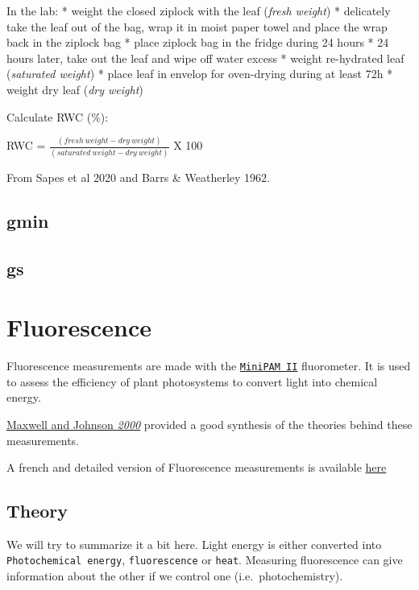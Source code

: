 \documentclass[
  12pt,
  american,
  a4paper,
  extrafontsizes,onecolumn,openright
  ]{memoir}
\begin{document}
In the lab:
* weight the closed ziplock with the leaf (\emph{fresh weight})
* delicately take the leaf out of the bag, wrap it in moist paper towel and place the wrap back in the ziplock bag
* place ziplock bag in the fridge during 24 hours
* 24 hours later, take out the leaf and wipe off water excess
* weight re-hydrated leaf (\emph{saturated weight})
* place leaf in envelop for oven-drying during at least 72h
* weight dry leaf (\emph{dry weight})

Calculate RWC (\%):

RWC = \(\frac{(fresh\ weight-dry\ weight)}{(saturated\ weight-dry\ weight)}\) X 100

From Sapes et al 2020 and Barrs \& Weatherley 1962.

\hypertarget{gmin}{%
\section{gmin}\label{gmin}}

\hypertarget{gs}{%
\section{gs}\label{gs}}

\hypertarget{fluorescence}{%
\chapter{Fluorescence}\label{fluorescence}}

Fluorescence measurements are made with the \href{document/machine/MiniPAM\%20II/minipamexp.pdf}{\texttt{MiniPAM\ II}} fluorometer.
It is used to assess the efficiency of plant photosystems to convert light into chemical energy.

\href{document/trait/fluorescence/Maxwell\%20and\%20Johnson\%20-\%202000\%20-\%20Chlorophyll\%20fluorescence—a\%20practical\%20guide.pdf}{Maxwell and Johnson \emph{2000}} provided a good synthesis of the theories behind these measurements.

A french and detailed version of Fluorescence measurements is available \href{document/machine/MiniPAM\%20II/Manuel\%20Mini-PAM\%20II6300_\%20Maxime\%20B}{here}

\hypertarget{theory}{%
\section{Theory}\label{theory}}

We will try to summarize it a bit here.
Light energy is either converted into \texttt{Photochemical\ energy}, \texttt{fluorescence} or \texttt{heat}.
Measuring fluorescence can give information about the other if we control one (i.e.~photochemistry).
\end{document}
